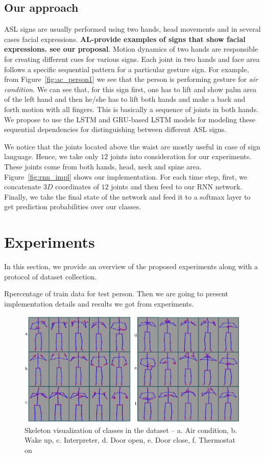 \documentclass[10pt,twocolumn,letterpaper]{article}
\begin{document}
\subsection{Our approach}
ASL signs are usually performed using two hands, head movements and in several  
cases facial expressions. {\bf AL-provide examples of signs that show facial expressions. see our proposal}. Motion dynamics of 
two hands are responsible for creating different cues for various signs. Each joint in two hands and face area follows a specific sequential pattern for a particular gesture sign. For example, from Figure~\ref{fig:ac_person1} we see that 
the person is performing gesture for \textit{air condition}. We can see that, for this sign first, one has to lift and show palm area of the left hand and then he/she has to lift both hands and make a back and forth motion with all fingers. This is basically a sequence of joints in both hands. We propose to use the LSTM and GRU-based LSTM models for modeling these 
sequential dependencies for distinguishing between different ASL signs. 

We notice that the joints located above the waist are mostly useful in case of sign language. Hence, we take only $12$ joints into
consideration for  our experiments. These joints come from both hands, head, neck and spine area. Figure~\ref{fig:rnn_impl} shows our implementation. For each time step, first, we concatenate $3D$ coordinates of $12$ joints and then feed to our RNN network. Finally, we take the final state of the network and feed 
it to a softmax layer to 
get prediction probabilities over our classes.


\section{Experiments}
In this section, we provide an overview of the proposed experiments along with a protocol of dataset collection. 

Rpercentage of train data for test person. Then we are going to present implementation details and results we got from experiments. 
\begin{figure}[h]
	\begin{center}
		\includegraphics[width=.8\linewidth]{sk_data_viz}
	\end{center}
	\caption{Skeleton visualization of classes in the dataset -- a. Air condition, b. Wake up, c. Interpreter, d. Door open, e. Door close, f. Thermostat on}
	\label{fig:sk_dat_viz}
\end{figure}
\end{document}
